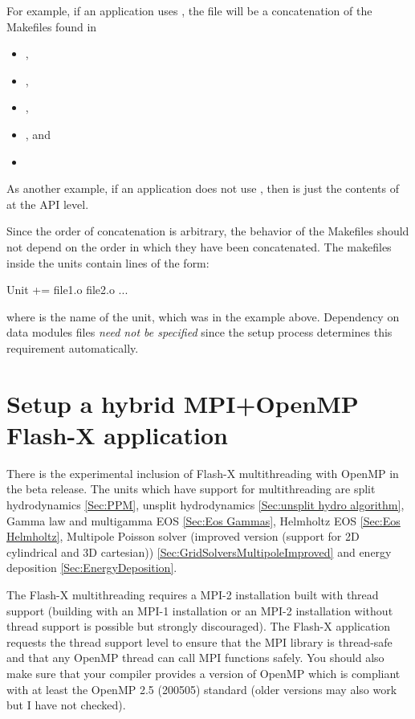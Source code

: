 For example, if an application uses
, the file 
\newline
{}
will be a concatenation of the Makefiles found in
\begin{itemize}
\item {},
\item {},
\item {},
\item {}, and
\item {}
\end{itemize}

As another example, if an application does not use , then
 is just the contents of
 at the API level.

Since the order of concatenation is arbitrary, the behavior of the
Makefiles should not depend on the order in which they have been
concatenated. The makefiles inside the units contain lines of the form:
\begin{codeseg}
Unit += file1.o file2.o ...
\end{codeseg}

\noindent where  is the name of the unit, which was  in
the example above.  Dependency on data
modules files \emph{need not be specified} since the setup process
determines this requirement automatically.

\section{Setup a hybrid MPI+OpenMP Flash-X application}
\label{Sec:hybridSetup}

There is the experimental inclusion of Flash-X multithreading with
OpenMP in the \flashx beta release.  The units which have support
for multithreading are split hydrodynamics \ref{Sec:PPM}, unsplit
hydrodynamics \ref{Sec:unsplit hydro algorithm}, Gamma law and
multigamma EOS \ref{Sec:Eos Gammas}, Helmholtz EOS \ref{Sec:Eos Helmholtz}, 
Multipole Poisson solver (improved version (support for
2D cylindrical and 3D cartesian))
\ref{Sec:GridSolversMultipoleImproved} and energy deposition
\ref{Sec:EnergyDeposition}.

The Flash-X multithreading requires a MPI-2 installation built with
thread support (building with an MPI-1 installation or an MPI-2
installation without thread support is possible but strongly
discouraged).  The Flash-X application requests the thread support level
 to ensure that the MPI library is
thread-safe and that any OpenMP thread can call MPI functions safely.
You should also make sure that your compiler provides a version of
OpenMP which is compliant with at least the OpenMP 2.5 (200505)
standard (older versions may also work but I have not checked).

